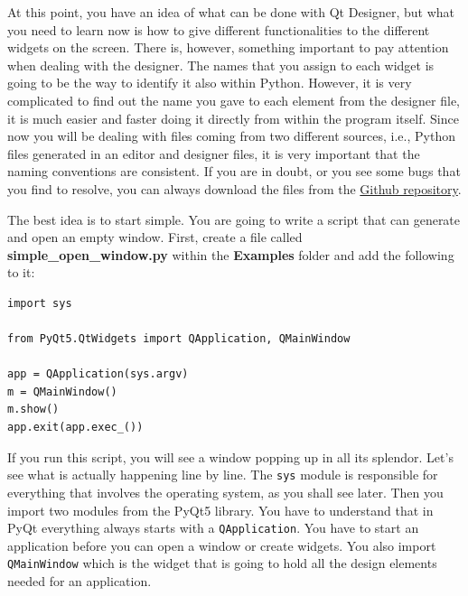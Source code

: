 At this point, you have an idea of what can be done with Qt Designer,
but what you need to learn now is how to give different functionalities
to the different widgets on the screen. There is, however, something
important to pay attention when dealing with the designer. The names
that you assign to each widget is going to be the way to identify it
also within Python. However, it is very complicated to find out the name
you gave to each element from the designer file, it is much easier and
faster doing it directly from within the program itself. Since now you
will be dealing with files coming from two different sources, i.e.,
Python files generated in an editor and designer files, it is very
important that the naming conventions are consistent. If you are in
doubt, or you see some bugs that you find to resolve, you can always
download the files from the
\href{https://github.com/PFTL/SimpleDaq/tree/master/PythonForTheLab/View/GUI}{Github
repository}.


The best idea is to start simple. You are going to write a script that
can generate and open an empty window. First, create a file called
\textbf{simple\_open\_window.py} within the \textbf{Examples} folder and
add the following to it:

\begin{verbatim}
import sys

from PyQt5.QtWidgets import QApplication, QMainWindow

app = QApplication(sys.argv)
m = QMainWindow()
m.show()
app.exit(app.exec_())
\end{verbatim}

If you run this script, you will see a window popping up in all its
splendor. Let's see what is actually happening line by line. The
\texttt{sys} module is responsible for everything that involves the
operating system, as you shall see later. Then you import two modules
from the PyQt5 library. You have to understand that in PyQt everything
always starts with a \texttt{QApplication}. You have to start an
application before you can open a window or create widgets. You also
import \texttt{QMainWindow} which is the widget that is going to hold
all the design elements needed for an application.

